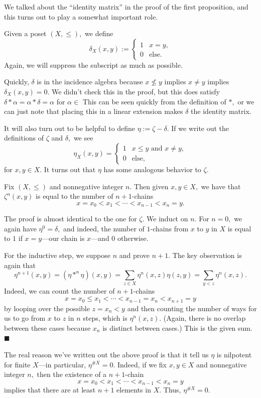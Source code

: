 We talked about the ``identity matrix'' in the proof of the first proposition, and this turns out to play a somewhat important role.
\begin{definition}
    Given a poset $(X,\le),$ we define
    \[\delta_X(x,y):=\begin{cases}
        1 & x=y, \\
        0 & \text{else}.
    \end{cases}\]
    Again, we will suppress the subscript as much as possible.
\end{definition}
Quickly, $\delta$ is in the incidence algebra because $x\not\le y$ implies $x\ne y$ implies $\delta_X(x,y)=0.$ We didn't check this in the proof, but this does satisfy $\delta*\alpha=\alpha*\delta=\alpha$ for $\alpha\in $ This can be seen quickly from the definition of $*,$ or we can just note that placing this in a linear extension makes $\delta$ the identity matrix.

It will also turn out to be helpful to define $\eta:=\zeta-\delta.$ If we write out the definitions of $\zeta$ and $\delta,$ we see
\[\eta_X(x,y)=\begin{cases}
    1 & x\le y\text{ and }x\ne y, \\
    0 & \text{else},
\end{cases}\]
for $x,y\in X.$ It turns out that $\eta$ has some analogous behavior to $\zeta.$
\begin{proposition}
    Fix $(X,\le)$ and nonnegative integer $n.$ Then given $x,y\in X,$ we have that $\zeta^n(x,y)$ is equal to the number of $n+1$-chains
    \[x=x_0<x_1<\cdots<x_{n-1}<x_n=y.\]
\end{proposition}
The proof is almost identical to the one for $\zeta.$ We induct on $n.$ For $n=0,$ we again have $\eta^0=\delta,$ and indeed, the number of $1$-chains from $x$ to $y$ in $X$ is equal to $1$ if $x=y$---our chain is $x$---and $0$ otherwise.

For the inductive step, we suppose $n$ and prove $n+1.$ The key observation is again that
\[\eta^{n+1}(x,y)=\left(\eta*^n\eta\right)(x,y)=\sum_{z\in X}\eta^n(x,z)\eta(z,y)=\sum_{y<z}\eta^n(x,z).\]
Indeed, we can count the number of $n+1$-chains
\[x=x_0\le x_1<\cdots<x_{n-1}=x_n<x_{n+1}=y\]
by looping over the possible $z=x_n<y$ and then counting the number of ways for us to go from $x$ to $z$ in $n$ steps, which is $\eta^n(x,z).$ (Again, there is no overlap between these cases because $x_n$ is distinct between cases.) This is the given sum. $\blacksquare$

The real reason we've written out the above proof is that it tell us $\eta$ is nilpotent for finite $X$---in particular, $\eta^{\#X}=0.$ Indeed, if we fix $x,y\in X$ and nonnegative integer $n,$ then the existence of a $n+1$-chain
\[x=x_0<x_1<\cdots<x_{n-1}<x_n=y\]
implies that there are at least $n+1$ elements in $X.$ Thus, $\eta^{\#X}=0.$

